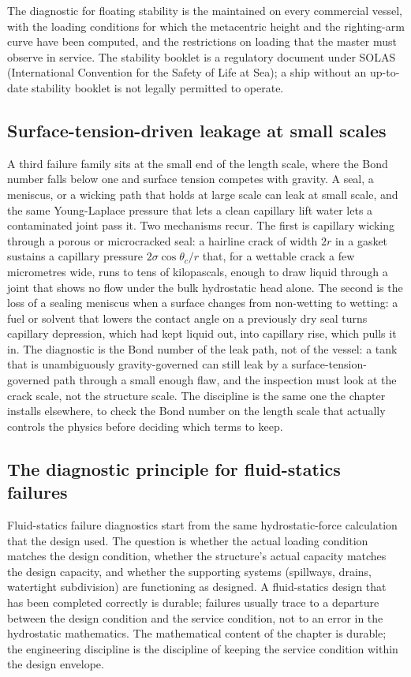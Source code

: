 The diagnostic for floating stability is the
 maintained on every commercial
vessel, with the loading conditions for which the metacentric
height and the righting-arm curve have been computed, and the
restrictions on loading that the master must observe in service.
The stability booklet is a regulatory document under SOLAS
(International Convention for the Safety of Life at Sea); a
ship without an up-to-date stability booklet is not legally
permitted to operate.

\subsection{Surface-tension-driven leakage at small scales}

A third failure family sits at the small end of the length scale, where
the Bond number falls below one and surface tension competes with gravity.
A seal, a meniscus, or a wicking path that holds at large scale can leak at
small scale, and the same Young-Laplace pressure that lets a clean
capillary lift water lets a contaminated joint pass it. Two mechanisms
recur. The first is capillary wicking through a porous or microcracked
seal: a hairline crack of width $2r$ in a gasket sustains a capillary
pressure $2\sigma\cos\theta_c/r$ that, for a wettable crack a few
micrometres wide, runs to tens of kilopascals, enough to draw liquid
through a joint that shows no flow under the bulk hydrostatic head alone.
The second is the loss of a sealing meniscus when a surface changes from
non-wetting to wetting: a fuel or solvent that lowers the contact angle on
a previously dry seal turns capillary depression, which had kept liquid
out, into capillary rise, which pulls it in. The diagnostic is the Bond
number of the leak path, not of the vessel: a tank that is unambiguously
gravity-governed can still leak by a surface-tension-governed path through
a small enough flaw, and the inspection must look at the crack scale, not
the structure scale. The discipline is the same one the chapter installs
elsewhere, to check the Bond number on the length scale that actually
controls the physics before deciding which terms to keep.

\subsection{The diagnostic principle for fluid-statics failures}

Fluid-statics failure diagnostics start from the same
hydrostatic-force calculation that the design used. The question
is whether the actual loading condition matches the design
condition, whether the structure's actual capacity matches the
design capacity, and whether the supporting systems (spillways,
drains, watertight subdivision) are functioning as designed. A
fluid-statics design that has been completed correctly is
durable; failures usually trace to a departure between the design
condition and the service condition, not to an error in the
hydrostatic mathematics. The mathematical content of the chapter
is durable; the engineering discipline is the discipline of
keeping the service condition within the design envelope.

